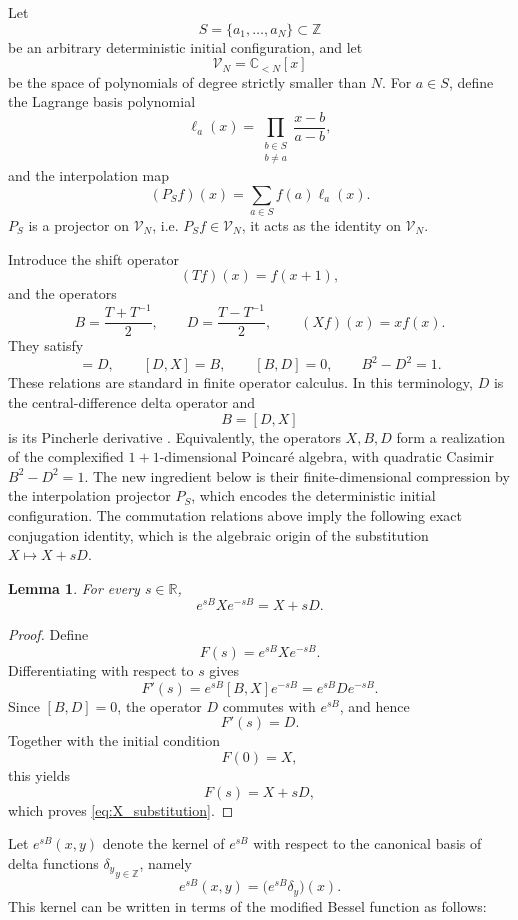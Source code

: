 \documentclass[11pt]{article}
\numberwithin{equation}{section}
\newtheorem{lemma}[theorem]{Lemma}
\newcommand{\1}{\mathbf 1}
\begin{document}
Let
\[
    S=\{a_1,\ldots,a_N\}\subset\mathbb Z
\]
be an arbitrary deterministic initial configuration, and let
\[
    \mathcal V_N=\mathbb C_{<N}[x]
\]
be the space of polynomials of degree strictly smaller than \(N\).  For
\(a\in S\), define the Lagrange basis polynomial
\begin{equation}
    \ell_a(x)
    =
    \prod_{\substack{b\in S\\b\neq a}}
    \frac{x-b}{a-b},
    \label{eq:general_lagrange_basis}
\end{equation}
and the interpolation map
\begin{equation}
    (P_Sf)(x)
    =
    \sum_{a\in S}f(a)\ell_a(x).
    \label{eq:general_interpolation_projector}
\end{equation}
$P_S$ is a projector on $\mathcal V_N$, i.e. 
\(P_Sf\in\mathcal V_N\), it acts as the identity on
\(\mathcal V_N\).

Introduce the shift operator
\[
    (Tf)(x)=f(x+1),
\]
and the operators
\begin{equation}
    B=\frac{T+T^{-1}}{2},
    \qquad
    D=\frac{T-T^{-1}}{2},
    \qquad
    (Xf)(x)=xf(x).
    \label{eq:BDX_operators}
\end{equation}
They satisfy
\begin{equation}
    [B,X]=D,
    \qquad
    [D,X]=B,
    \qquad
    [B,D]=0,
    \qquad
    B^2-D^2=1.
\label{eq:BDX_algebra}
\end{equation}
These relations are standard in finite operator calculus.  In this
terminology, \(D\) is the central-difference delta operator and
\[
    B=[D,X]
\]
is its Pincherle derivative
\cite{RotaKahanerOdlyzko1973,DimakisMullerHoissenStriker1996}.
Equivalently, the operators \(X,B,D\) form a realization of the complexified
\(1+1\)-dimensional Poincaré algebra, with quadratic Casimir
\(B^2-D^2=1\).  The new ingredient below is their finite-dimensional
compression by the interpolation projector \(P_S\), which encodes the
deterministic initial configuration.
The commutation relations above imply the following exact conjugation identity,
which is the algebraic origin of the substitution $X\mapsto X+sD$.
\begin{lemma}
\label{lem:X_conjugation}
For every $s\in\mathbb R$,
\begin{equation}
e^{sB}Xe^{-sB}=X+sD.
\label{eq:X_substitution}
\end{equation}
\end{lemma}

\begin{proof}
Define
$$
F(s)=e^{sB}Xe^{-sB}.
$$
Differentiating with respect to $s$ gives
$$
F'(s)
=
e^{sB}[B,X]e^{-sB}
=
e^{sB}De^{-sB}.
$$
Since $[B,D]=0$, the operator $D$ commutes with $e^{sB}$, and hence
$$
F'(s)=D.
$$
Together with the initial condition
$$
F(0)=X,
$$
this yields
$$
F(s)=X+sD,
$$
which proves \eqref{eq:X_substitution}.
\end{proof}
Let $e^{sB}(x,y)$ denote the kernel of $e^{sB}$ with respect to the canonical
basis of delta functions ${\delta_y}_{y\in\mathbb Z}$, namely
$$
e^{sB}(x,y)
=
\bigl(e^{sB}\delta_y\bigr)(x).
$$
This kernel can be written in terms of the modified Bessel function as follows:
\end{document}
